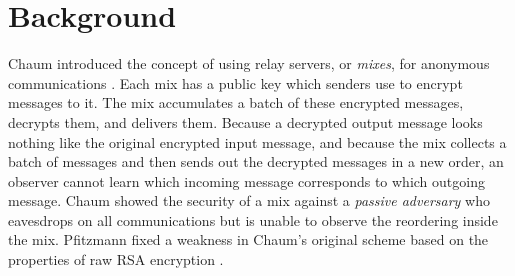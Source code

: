 \documentclass[11pt]{IEEEtran}
\begin{document}


%


\section{Background}
\label{sec:background}

Chaum introduced the concept of using relay servers, or \emph{mixes},
for anonymous communications \cite{chaum-mix}. Each mix has a public key
which senders use to encrypt messages to it. The mix accumulates a batch
of these encrypted messages, decrypts them, and delivers them. Because
a decrypted output message looks nothing like the original encrypted
input message,
and because the mix collects a batch of messages and then sends out the
decrypted messages in a new order, an observer cannot learn which incoming
message corresponds to which outgoing message. Chaum showed the
security of a mix against a \emph{passive adversary} who eavesdrops on
all communications but is unable to observe the reordering inside the mix.
Pfitzmann fixed a weakness in Chaum's original scheme based on the
properties of raw RSA encryption \cite{pfitzmann90how}.
\end{document}
